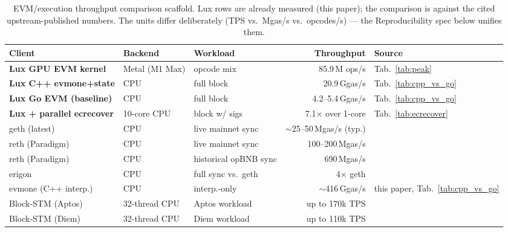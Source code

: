 \begin{table}[h]
\centering
\small
\begin{tabular}{@{}lllrl@{}}
\toprule
\textbf{Client} & \textbf{Backend} & \textbf{Workload} & \textbf{Throughput} & \textbf{Source} \\
\midrule
\textbf{Lux GPU EVM kernel}     & Metal (M1 Max)    & opcode mix       & 85.9\,M ops/s       & Tab.~\ref{tab:peak} \\
\textbf{Lux C++ evmone+state}   & CPU               & full block        & 20.9\,Ggas/s        & Tab.~\ref{tab:cpp_vs_go} \\
\textbf{Lux Go EVM (baseline)}  & CPU               & full block        & 4.2--5.4\,Ggas/s    & Tab.~\ref{tab:cpp_vs_go} \\
\textbf{Lux + parallel ecrecover} & 10-core CPU     & block w/ sigs    & 7.1$\times$ over 1-core & Tab.~\ref{tab:ecrecover} \\
\midrule
geth (latest)                   & CPU               & live mainnet sync & $\sim$25--50\,Mgas/s (typ.) & \cite{gethgithub,paradigmreth2024} \\
reth (Paradigm)                 & CPU               & live mainnet sync & 100--200\,Mgas/s    & \cite{paradigmreth2024} \\
reth (Paradigm)                 & CPU               & historical opBNB sync & 690\,Mgas/s        & \cite{paradigmreth2024} \\
erigon                          & CPU               & full sync vs.\ geth & 4$\times$ geth      & \cite{chainstackgetherigon} \\
evmone (C++ interp.)            & CPU               & interp.-only      & $\sim$416\,Ggas/s   & this paper, Tab.~\ref{tab:cpp_vs_go} \\
Block-STM (Aptos)               & 32-thread CPU     & Aptos workload    & up to 170k TPS      & \cite{blockstmppopp} \\
Block-STM (Diem)                & 32-thread CPU     & Diem workload     & up to 110k TPS      & \cite{blockstmppopp} \\
\bottomrule
\end{tabular}
\caption{EVM/execution throughput comparison scaffold. Lux rows are
already measured (this paper); the comparison is against the cited
upstream-published numbers. The units differ deliberately (TPS vs.\ Mgas/s
vs.\ opcodes/s) --- the Reproducibility spec below unifies them.}
\label{tab:evmgpu-comparison}
\end{table}

